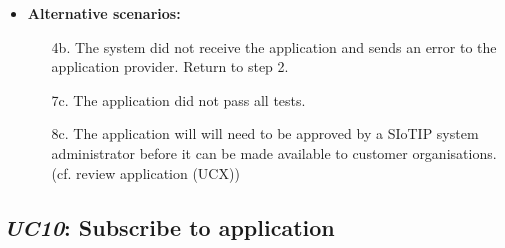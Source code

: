 \begin{itemize}
    \item \textbf{Alternative scenarios:}
    \begin{enumerate}
        \item [4b.] The system did not receive the application and sends an error
                    to the application provider. Return to step 2.
        \item [7c.] The application did not pass all tests.
        \item [8c.] The application will will need to be approved by a SIoTIP
                    system administrator before it can be made available to
                    customer organisations. (cf. review application (UCX))
    \end{enumerate}
\end{itemize}

\subsection{\emph{UC10}: Subscribe to application}
